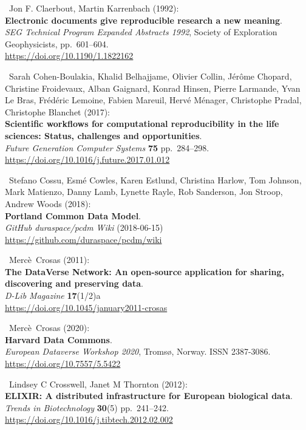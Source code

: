 \begin{thebibliography}{9}
~Jon F. Claerbout, Martin Karrenbach (1992):\\
\textbf{Electronic documents give reproducible research a new
meaning}.\\
\emph{SEG Technical Program Expanded Abstracts 1992}, Society of
Exploration Geophysicists, pp.~601--604.\\
\url{https://doi.org/10.1190/1.1822162}

~Sarah Cohen-Boulakia, Khalid Belhajjame, Olivier Collin, Jérôme
Chopard, Christine Froidevaux, Alban Gaignard, Konrad Hinsen, Pierre
Larmande, Yvan Le Bras, Frédéric Lemoine, Fabien Mareuil, Hervé Ménager,
Christophe Pradal, Christophe Blanchet (2017):\\
\textbf{Scientific workflows for computational reproducibility in the
life sciences: Status, challenges and opportunities}.\\
\emph{Future Generation Computer Systems} \textbf{75} pp.~284--298.\\
\url{https://doi.org/10.1016/j.future.2017.01.012}

~Stefano Cossu, Esmé Cowles, Karen Estlund, Christina Harlow,
Tom Johnson, Mark Matienzo, Danny Lamb, Lynette Rayle, Rob Sanderson,
Jon Stroop, Andrew Woods (2018):\\
\textbf{Portland Common Data Model}.\\
\emph{GitHub duraspace/pcdm Wiki} (2018-06-15)
\url{https://github.com/duraspace/pcdm/wiki}

~Mercè~Crosas (2011):\\
\textbf{The DataVerse Network: An open-source application for sharing,
discovering and preserving data}.\\
\emph{D-Lib Magazine} \textbf{17}(1/2)a\\
\url{https://doi.org/10.1045/january2011-crosas}

~Mercè~Crosas (2020):\\
\textbf{Harvard Data Commons}.\\
\emph{European Dataverse Workshop 2020}, Tromsø, Norway. ISSN
2387-3086.\\
\url{https://doi.org/10.7557/5.5422}

~Lindsey C Crosswell, Janet M Thornton (2012):\\
\textbf{ELIXIR: A distributed infrastructure for European biological
data}.\\
\emph{Trends in Biotechnology} \textbf{30}(5) pp.~241--242.\\
\url{https://doi.org/10.1016/j.tibtech.2012.02.002}


\end{thebibliography}
